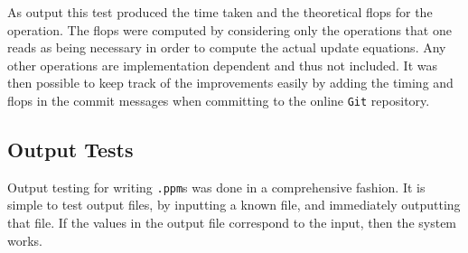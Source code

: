 As output this test produced the time taken and the theoretical flops for the operation.
The flops were computed by considering only the operations that one reads as being necessary in order to compute the actual update equations.
Any other operations are implementation dependent and thus not included.
It was then possible to keep track of the improvements easily by adding the timing and flops in the commit messages when committing to the online \texttt{Git} repository.

\subsection{Output Tests}
	Output testing for writing \texttt{.ppm}s was done in a comprehensive fashion.
	It is simple to test output files, by inputting a known file, and immediately outputting that file.
	If the values in the output file correspond to the input, then the system works.


